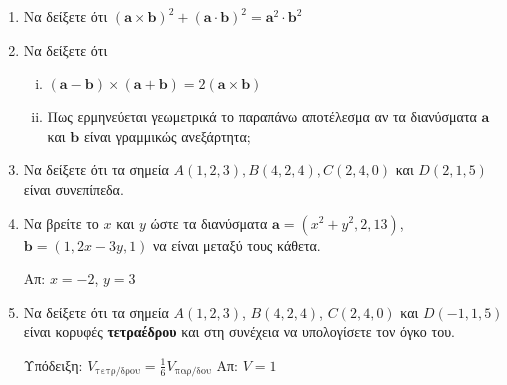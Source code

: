 \documentclass[a4paper,table]{report}
\renewcommand{\vec}{\mathbf}
\begin{document}
\begin{enumerate}[itemsep=0.7\baselineskip]
  \item Να δείξετε ότι $ (\vec{a}\times \vec{b})^{2} + (\vec{a}\cdot \vec{b})^{2} =
    \vec{a}^{2}\cdot \vec{b}^{2} $  

  \item Να δείξετε ότι
    \begin{enumerate}[i)]
      \item $ ( \vec{a} - \vec{b} ) \times ( \vec{a} + \vec{b} ) = 2 (\vec{a} \times 
        \vec{b}) $
      \item Πως ερμηνεύεται γεωμετρικά το παραπάνω αποτέλεσμα αν τα διανύσματα 
        $ \vec{a} $ και $ \vec{b} $ είναι γραμμικώς ανεξάρτητα;
    \end{enumerate}


  \item Να δείξετε ότι τα σημεία $ A(1,2,3), B(4,2,4), C(2,4,0) $ και $ D(2,1,5) $ 
    είναι συνεπίπεδα.

  \item Να βρείτε το $x$ και $y$ ώστε τα διανύσματα $ \vec{a} = (x^{2}+y^{2},2,13) $, 
    $ \vec{b} = (1,2x-3y,1) $ να είναι μεταξύ τους κάθετα. 

    \hfill Απ: $ x=-2 $, $ y=3 $

  \item Να δείξετε ότι τα σημεία $ A(1,2,3) $, $ B(4,2,4) $, $ C(2,4,0) $ και 
    $ D(-1,1,5) $ είναι κορυφές \textbf{τετραέδρου} και στη συνέχεια να υπολογίσετε τον 
    όγκο του. 

    \textcolor{Col1}{Υπόδειξη:} 
    $ V_{\text{τετρ/δρου}} = \frac{1}{6} V_{\text{παρ/δου}} $   
    \hfill Απ: $ V=1 $


\end{enumerate}
\end{document}
